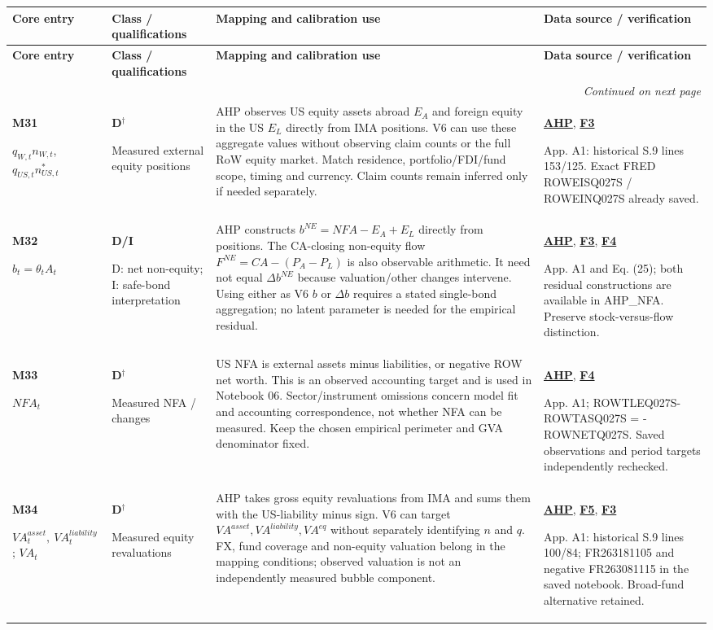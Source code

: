 \documentclass[10pt,a4paper,landscape]{article}
\makeatletter
\newenvironment{measuretable}{%
\fontsize{9.4}{10.8}\selectfont\setlength{\parskip}{1pt}
\begin{longtable}{@{}P{\dimexpr .14\textwidth-4.2pt\relax}P{\dimexpr .135\textwidth-4.05pt\relax}P{\dimexpr .455\textwidth-13.65pt\relax}P{\dimexpr .27\textwidth-8.1pt\relax}@{}}
\toprule\rowcolor{tablehead}\textbf{Core entry} & \textbf{Class / qualifications} & \textbf{Mapping and calibration use} & \textbf{Data source / verification}\\\midrule
\endfirsthead
\toprule\rowcolor{tablehead}\textbf{Core entry} & \textbf{Class / qualifications} & \textbf{Mapping and calibration use} & \textbf{Data source / verification}\\\midrule
\endhead\midrule\multicolumn{4}{r}{\footnotesize\itshape Continued on next page}\\\endfoot
\bottomrule\endlastfoot
}{\end{longtable}}
\makeatother
\begin{document}
\begin{measuretable}
\textbf{M31}\par $q_{W,t}n_{W,t}$, $q_{US,t}n_{US,t}^*$ & \textbf{D}$^\dagger$\par Measured external equity positions & AHP observes US equity assets abroad $E_A$ and foreign equity in the US $E_L$ directly from IMA positions. V6 can use these aggregate values without observing claim counts or the full RoW equity market. Match residence, portfolio/FDI/fund scope, timing and currency. Claim counts remain inferred only if needed separately. & \hyperlink{src-AHP}{\textbf{AHP}}, \hyperlink{src-F3}{\textbf{F3}}\par App. A1: historical S.9 lines 153/125. Exact FRED ROWEISQ027S / ROWEINQ027S already saved.\\[4pt]
\textbf{M32}\par $b_t=\theta_tA_t$ & \textbf{D/I}\par D: net non-equity; I: safe-bond interpretation & AHP constructs $b^{NE}=NFA-E_A+E_L$ directly from positions. The CA-closing non-equity flow $F^{NE}=CA-(P_A-P_L)$ is also observable arithmetic. It need not equal $\Delta b^{NE}$ because valuation/other changes intervene. Using either as V6 $b$ or $\Delta b$ requires a stated single-bond aggregation; no latent parameter is needed for the empirical residual. & \hyperlink{src-AHP}{\textbf{AHP}}, \hyperlink{src-F3}{\textbf{F3}}, \hyperlink{src-F4}{\textbf{F4}}\par App. A1 and Eq. (25); both residual constructions are available in AHP\_NFA. Preserve stock-versus-flow distinction.\\[4pt]
\textbf{M33}\par $NFA_t$ & \textbf{D}$^\dagger$\par Measured NFA / changes & US NFA is external assets minus liabilities, or negative ROW net worth. This is an observed accounting target and is used in Notebook 06. Sector/instrument omissions concern model fit and accounting correspondence, not whether NFA can be measured. Keep the chosen empirical perimeter and GVA denominator fixed. & \hyperlink{src-AHP}{\textbf{AHP}}, \hyperlink{src-F4}{\textbf{F4}}\par App. A1; ROWTLEQ027S-ROWTASQ027S = -ROWNETQ027S. Saved observations and period targets independently rechecked.\\[4pt]
\textbf{M34}\par $VA_t^{asset},\ VA_t^{liability}$; $VA_t$ & \textbf{D}$^\dagger$\par Measured equity revaluations & AHP takes gross equity revaluations from IMA and sums them with the US-liability minus sign. V6 can target $VA^{asset},VA^{liability},VA^{eq}$ without separately identifying $n$ and $q$. FX, fund coverage and non-equity valuation belong in the mapping conditions; observed valuation is not an independently measured bubble component. & \hyperlink{src-AHP}{\textbf{AHP}}, \hyperlink{src-F5}{\textbf{F5}}, \hyperlink{src-F3}{\textbf{F3}}\par App. A1: historical S.9 lines 100/84; FR263181105 and negative FR263081115 in the saved notebook. Broad-fund alternative retained.\\[4pt]

\end{measuretable}
\end{document}
